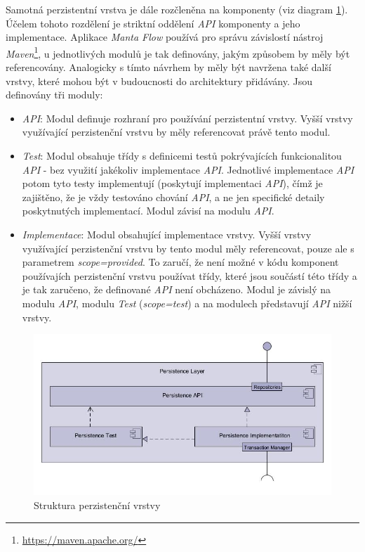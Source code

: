 Samotná perzistentní vrstva je dále rozčleněna na komponenty (viz diagram \ref{fig:des-persistence}). Účelem tohoto rozdělení je striktní oddělení \textit{API} komponenty a jeho implementace. Aplikace \textit{Manta Flow} používá pro správu závislostí nástroj \textit{Maven}\footnote{\url{https://maven.apache.org/}}, u jednotlivých modulů je tak definovány, jakým způsobem by měly být referencovány. Analogicky s tímto návrhem by měly být navržena také další vrstvy, které mohou být v budoucnosti do architektury přidávány. Jsou definovány tři moduly:

\begin{itemize}
   \item{\textit{API}}: Modul definuje rozhraní pro používání perzistentní vrstvy. Vyšší vrstvy využívající perzistenční vrstvu by měly referencovat právě tento modul.
   \item{\textit{Test}}: Modul obsahuje třídy s definicemi testů pokrývajících funkcionalitou \textit{API} - bez využití jakékoliv implementace \textit{API}. Jednotlivé implementace \textit{API} potom tyto testy implementují (poskytují implementaci \textit{API}), čímž je zajištěno, že je vždy testováno chování \textit{API}, a ne jen specifické detaily poskytnutých implementací. Modul závisí na modulu \textit{API}.
   \item{\textit{Implementace}}: Modul obsahující implementace vrstvy. Vyšší vrstvy využívající perzistenční vrstvu by tento modul měly referencovat, pouze ale s parametrem \textit{scope=provided}. To zaručí, že není možné v kódu komponent používajích perzistenční vrstvu používat třídy, které jsou součástí této třídy a je tak zaručeno, že definované \textit{API} není obcházeno. Modul je závislý na modulu \textit{API}, modulu \textit{Test} (\textit{scope=test}) a na modulech představují \textit{API} nižší vrstvy.
\end{itemize}

\begin{figure}
\begin{center}
\includegraphics[width=12cm]{figures/persistance_module}
\caption{Struktura perzistenční vrstvy}
\label{fig:des-persistence}
\end{center}
\end{figure}

